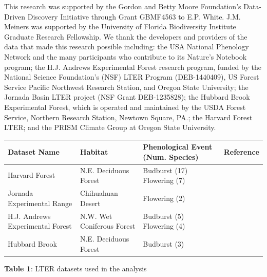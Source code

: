 \documentclass[fleqn,12pt,lineno]{article}
\begin{document}
This research was supported by the Gordon and Betty Moore Foundation’s Data-Driven Discovery Initiative through Grant GBMF4563 to E.P. White. J.M. Meiners was supported by the University of Florida Biodiversity Institute Graduate Research Fellowship. We thank the developers and providers of the data that made this research possible including: the USA National Phenology Network and the many participants who contribute to its Nature’s Notebook program; the H.J. Andrews Experimental Forest research program, funded by the National Science Foundation's (NSF) LTER Program (DEB-1440409), US Forest Service Pacific Northwest Research Station, and Oregon State University; the Jornada Basin LTER project (NSF Grant DEB-1235828); the Hubbard Brook Experimental Forest, which is operated and maintained by the USDA Forest Service, Northern Research Station, Newtown Square, PA.; the Harvard Forest LTER; and the PRISM Climate Group at Oregon State University.








\newpage
\scriptsize
    \begin{tabular}{ | l | l | l | l |}
    \hline
    Dataset Name & Habitat &  Phenological Event (Num. Species) & Reference \\ \hline
    Harvard Forest & N.E. Deciduous Forest & Budburst (17) Flowering (7) & \citep{okeefe2015} \\
    Jornada Experimental Range & Chihuahuan Desert & Flowering (2) &  \\
    H.J. Andrews Experimental Forest & N.W. Wet Coniferous Forest & Budburst (5) Flowering (4) & \citep{schulze2017} \\
    Hubbard Brook & N.E. Deciduous Forest & Budburst (3) & \citep{bailey2018} \\
    \hline
    \end{tabular}
\newline
\textbf{Table 1}: LTER datasets used in the analysis





\newpage
\end{document}
